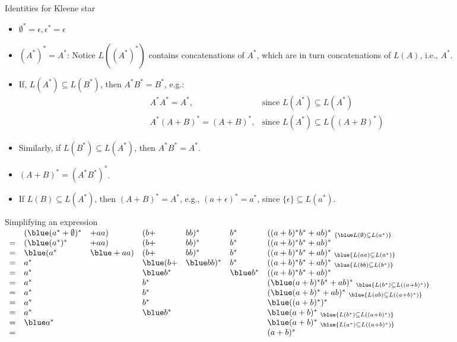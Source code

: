 \documentclass{prosper}%
\begin{document}
\begin{slide}{Identities for Kleene star}
\begin{itemize}
\item $\emptyset^*=\epsilon, \epsilon^*=\epsilon$
\item $(A^*)^*=A^*$: Notice $L((A^*)^*)$ contains concatenations of $A^*$, which are in turn concatenations of $L(A)$, i.e., $A^*$.
\item If, $L(A^*)\subseteq L(B^*)$, then $A^*B^*=B^*$, e.g.:
\[
\begin{array}{ll}
A^*A^*=A^*, &\mbox{since }L(A^*)\subseteq L(A^*)\\
A^*(A+B)^*=(A+B)^*, &\mbox{since }L(A^*)\subseteq L((A+B)^*)
\end{array}
\]
\item Similarly, if $L(B^*)\subseteq L(A^*)$, then $A^*B^*=A^*$.
\item $(A+B)^*=(A^*B^*)^*$.
\item If $L(B)\subseteq L(A^*)$, then $(A+B)^*=A^*$, e.g., $(a+\epsilon)^*=a^*$, since $\{\epsilon\} \subseteq L(a^*)$.
\end{itemize}
\end{slide}

\begin{slide}{Simplifying an expression}
{\small
\(
\begin{array}{lllllllll}
&({\blue(a^*+\emptyset)^*}&+aa)&(b+&bb)^*&b^*&((a+b)^*b^*+ab)^* \ _{\{\blue L(\emptyset)\subseteq L(a^*)\}} \\
=&({\blue (a^*)^*}&+aa)&(b+&bb)^*&b^*&((a+b)^*b^*+ab)^*\\
=&{\blue( a^*}&{\blue +aa)}&(b+&bb)^*&b^*&((a+b)^*b^*+ab)^* \ _{\blue\{ L(aa)\subseteq L(a^*)\}}\\
=&a^*&&{\blue (b+}&{\blue bb)^*}&b^*&((a+b)^*b^*+ab)^*\ _{\blue\{ L(bb)\subseteq L(b^*)\}}\\
=&a^*&&{\blue b^*}&&{\blue b^*}&((a+b)^*b^*+ab)^*\\
=&a^*&&b^*&&&({\blue (a+b)^*b^*}+ab)^* \ _{\blue \{L(b^*)\subseteq L((a+b)^*)\}}\\
=&a^*&&b^*&&&({\blue (a+b)^*+ab})^* \ _{\blue \{L(ab)\subseteq L((a+b)^*)\}}\\
=&a^*&&b^*&&&{\blue ((a+b)^*)^*} \\
=&a^*&&{\blue b^*}&&&{\blue (a+b)^*} \ _{\blue \{L(b^*)\subseteq L((a+b)^*)\}}\\
=&{\blue a^*}&&&&&{\blue (a+b)^*} \ _{\blue \{L(a^*)\subseteq L((a+b)^*)\}}\\
=&&&&&&(a+b)^* 
\end{array}
\)
}
\end{slide}
\end{document}
